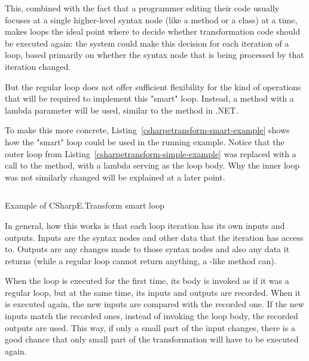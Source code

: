 This, combined with the fact that a programmer editing their code usually focuses at a single higher-level syntax node (like a method or a class) at a time, makes  loops the ideal point where to decide whether transformation code should be executed again: the system could make this decision for each iteration of a  loop, based primarily on whether the syntax node that is being processed by that iteration changed.

But the regular  loop does not offer sufficient flexibility for the kind of operations that will be required to implement this "smart"  loop. Instead, a method with a lambda parameter will be used, similar to the  method in .NET. \cite{parallel-foreach}

\medskip

To make this more concrete, Listing~\ref{csharpetransform-smart-example} shows how the "smart"  loop could be used in the running example. Notice that the outer  loop from Listing~\ref{csharpetransform-simple-example} was replaced with a call to the  method, with a lambda serving as the loop body. Why the inner loop was not similarly changed will be explained at a later point.

\begin{listing}
\inputminted[firstline=9,lastline=27]{csharp}{samples/CSharpETransform.Smart/EntityTransformation.cs}
\caption{Example of CSharpE.Transform smart  loop}
\label{csharpetransform-smart-example}
\end{listing}

\medskip

In general, how this works is that each loop iteration has its own inputs and outputs. Inputs are the syntax nodes and other data that the iteration has access to. Outputs are any changes made to those syntax nodes and also any data it returns (while a regular  loop cannot return anything, a -like method can).

When the loop is executed for the first time, its body is invoked as if it was a regular  loop, but at the same time, its inputs and outputs are recorded. When it is executed again, the new inputs are compared with the recorded one. If the new inputs match the recorded ones, instead of invoking the loop body, the recorded outputs are used. This way, if only a small part of the input changes, there is a good chance that only small part of the transformation will have to be executed again.

